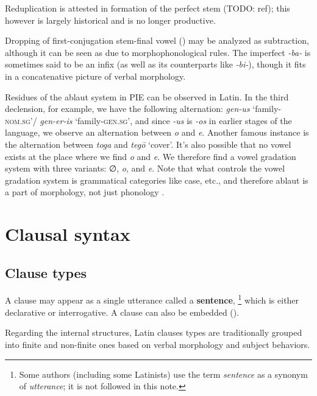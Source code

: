 \documentclass[a4paper, oneside, 12pt]{report}
\newcommand*{\citepage}[1]{p.~{#1}}
\newcommand*{\concept}[1]{\textbf{#1}}
\newcommand*{\term}[1]{\emph{#1}}
\newcommand{\form}[1]{\emph{#1}}
\newcommand*{\category}[1]{\textsc{#1}}
\newcommand{\translate}[1]{`#1'}
\begin{document}
Reduplication is attested in 
formation of the perfect stem (TODO: ref);
this however is largely historical 
and is no longer productive.

Dropping of first-conjugation stem-final vowel ()
may be analyzed as subtraction,
although it can be seen as due to morphophonological rules.
The imperfect \form{-ba-} is sometimes said to be an infix 
(as well as its counterparts like \form{-bi-}),
though it fits in a concatenative picture of verbal morphology.

Residues of the ablaut system in PIE can be observed in Latin.
In the third declension, for example,
we have the following alternation:
\form{gen-us} \translate{family-\category{nom.sg}}/
\form{gen-er-is} \translate{family-\category{gen.sg}},
and since \form{-us} is \form{-os} in earlier stages of the language,
we observe an alternation between \form{o} and \form{e}.
Another famous instance is the alternation between \form{toga} and \form{teg\={o}} \translate{cover}.
It's also possible that no vowel exists at the place where we find \form{o} and \form{e}.
We therefore find a vowel gradation system with three variants:
∅, \form{o}, and \form{e}.
Note that what controls the vowel gradation system is grammatical categories like case, etc.,
and therefore ablaut is a part of morphology, not just phonology
\citep[\citepage{46}]{weiss2009outline}.



\section{Clausal syntax}\label{sec:grammatical.clause}

\subsection{Clause types}\label{sec:grammatical.clause.overview.clause-types}

A clause may appear as a single utterance called a \concept{sentence},%
\footnote{
    Some authors (including some Latinists) use the term \term{sentence}
    as a synonym of \term{utterance};
    it is not followed in this note.
}
which is either declarative or interrogative.
A clause can also be embedded ().

Regarding the internal structures, Latin clauses types are traditionally grouped into finite and non-finite ones based on verbal morphology and subject behaviors.  
\end{document}

